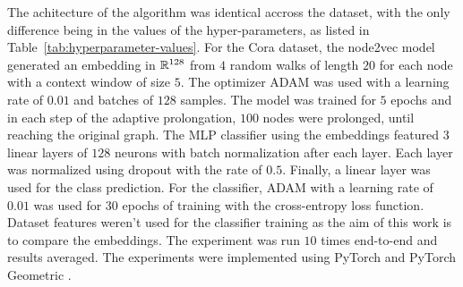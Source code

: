 The achitecture of the algorithm was identical accross the dataset, with the only difference being in the values of the hyper-parameters, as listed in Table~\ref{tab:hyperparameter-values}. For the Cora dataset, the node2vec model generated an embedding in \( \mathbb{R}^{128} \) from \( 4 \) random walks of length \( 20 \) for each node with a context window of size \( 5 \). The optimizer ADAM \cite{kingma_adam:_2017} was used with a learning rate of \( 0.01 \) and batches of \( 128 \) samples. The model was trained for \( 5 \) epochs and in each step of the adaptive prolongation, \( 100 \) nodes were prolonged, until reaching the original graph. The MLP classifier using the embeddings featured \( 3 \) linear layers of \( 128 \) neurons with batch normalization after each layer. Each layer was normalized using dropout \cite{srivastava_dropout_2014} with the rate of \( 0.5 \). Finally, a linear layer was used for the class prediction. For the classifier, ADAM with a learning rate of \( 0.01 \) was used for \( 30 \) epochs of training with the cross-entropy loss function. Dataset features weren't used for the classifier training as the aim of this work is to compare the embeddings. The experiment was run \( 10 \) times end-to-end and results averaged. The experiments were implemented using PyTorch \cite{paszke_pytorch_2019} and PyTorch Geometric \cite{fey_fast_2019}.

